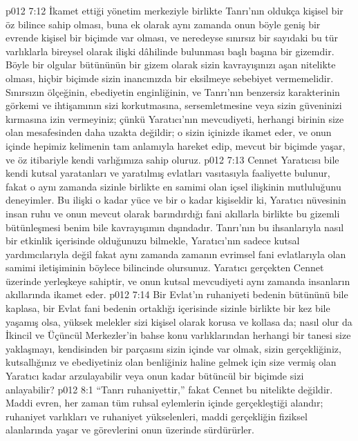 \vs p012 7:12 İkamet ettiği yönetim merkeziyle birlikte Tanrı’nın oldukça kişisel bir öz bilince sahip olması, buna ek olarak aynı zamanda onun böyle geniş bir evrende kişisel bir biçimde var olması, ve neredeyse sınırsız bir sayıdaki bu tür varlıklarla bireysel olarak ilişki dâhilinde bulunması başlı başına bir gizemdir. Böyle bir olgular bütününün bir gizem olarak sizin kavrayışınızı aşan nitelikte olması, hiçbir biçimde sizin inancınızda bir eksilmeye sebebiyet vermemelidir. Sınırsızın ölçeğinin, ebediyetin enginliğinin, ve Tanrı’nın benzersiz karakterinin görkemi ve ihtişamının sizi korkutmasına, sersemletmesine veya sizin güveninizi kırmasına izin vermeyiniz; çünkü Yaratıcı’nın mevcudiyeti, herhangi birinin size olan mesafesinden daha uzakta değildir; o sizin içinizde ikamet eder, ve onun içinde hepimiz kelimenin tam anlamıyla hareket edip, mevcut bir biçimde yaşar, ve öz itibariyle kendi varlığımıza sahip oluruz.
\vs p012 7:13 Cennet Yaratıcısı bile kendi kutsal yaratanları ve yaratılmış evlatları vasıtasıyla faaliyette bulunur, fakat o aynı zamanda sizinle birlikte en samimi olan içsel ilişkinin mutluluğunu deneyimler. Bu ilişki o kadar yüce ve bir o kadar kişiseldir ki, Yaratıcı nüvesinin insan ruhu ve onun mevcut olarak barındırdığı fani akıllarla birlikte bu gizemli bütünleşmesi benim bile kavrayışımın dışındadır. Tanrı’nın bu ihsanlarıyla nasıl bir etkinlik içerisinde olduğunuzu bilmekle, Yaratıcı’nın sadece kutsal yardımcılarıyla değil fakat aynı zamanda zamanın evrimsel fani evlatlarıyla olan samimi iletişiminin böylece bilincinde olursunuz. Yaratıcı gerçekten Cennet üzerinde yerleşkeye sahiptir, ve onun kutsal mevcudiyeti aynı zamanda insanların akıllarında ikamet eder.
\vs p012 7:14 Bir Evlat’ın ruhaniyeti bedenin bütününü bile kaplasa, bir Evlat fani bedenin ortaklığı içerisinde sizinle birlikte bir kez bile yaşamış olsa, yüksek melekler sizi kişisel olarak korusa ve kollasa da; nasıl olur da İkincil ve Üçüncül Merkezler’in bahse konu varlıklarından herhangi bir tanesi size yaklaşmayı, kendisinden bir parçasını sizin içinde var olmak, sizin gerçekliğiniz, kutsallığınız ve ebediyetiniz olan benliğiniz haline gelmek için size vermiş olan Yaratıcı kadar arzulayabilir veya onun kadar bütüncül bir biçimde sizi anlayabilir?
\vs p012 8:1 “Tanrı ruhaniyettir,” fakat Cennet bu nitelikte değildir. Maddi evren, her zaman tüm ruhsal eylemlerin içinde gerçekleştiği alandır; ruhaniyet varlıkları ve ruhaniyet yükselenleri, maddi gerçekliğin fiziksel alanlarında yaşar ve görevlerini onun üzerinde sürdürürler.
